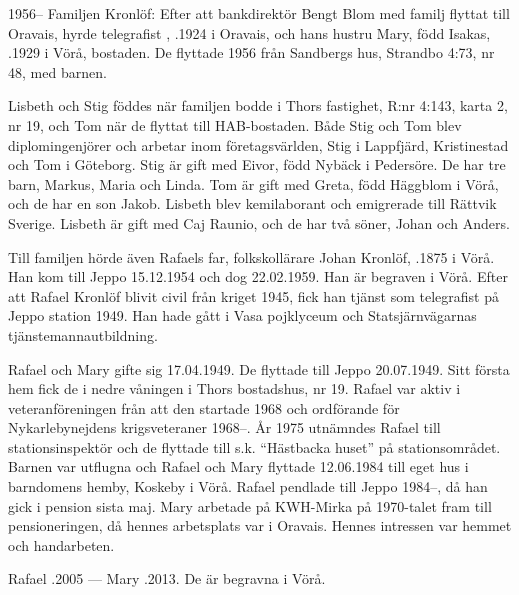 1956--
Familjen Kronlöf:	Efter att bankdirektör Bengt Blom med familj flyttat till	Oravais, hyrde telegrafist , .1924 i Oravais, och hans hustru Mary, född Isakas, .1929 i Vörå, bostaden. De flyttade 1956 från Sandbergs hus, Strandbo 4:73, nr 48, med barnen.
\begin{jhchildren}
  \item {}
  \item {}
  \item {}
\end{jhchildren}
Lisbeth och Stig föddes när familjen bodde i Thors fastighet, R:nr 4:143, karta 2, nr 19, och Tom när de flyttat till HAB-bostaden. Både Stig och Tom blev diplomingenjörer och	arbetar inom företagsvärlden, Stig i Lappfjärd, Kristinestad 	och Tom i Göteborg. Stig är gift med Eivor, född Nybäck i Pedersöre. De har tre barn, Markus, Maria och Linda. Tom är gift med Greta, född Häggblom i Vörå, och de har en son Jakob. Lisbeth blev kemilaborant och emigrerade till Rättvik	Sverige. Lisbeth är gift med Caj Raunio, och de har två söner, Johan och Anders.

Till familjen hörde även Rafaels far, folkskollärare Johan Kronlöf, .1875 i Vörå. Han kom till Jeppo 15.12.1954 och dog 22.02.1959. Han är begraven i Vörå. Efter att Rafael Kronlöf blivit civil från kriget 1945, fick han	tjänst som telegrafist på Jeppo station 1949. Han hade gått i	Vasa pojklyceum och Statsjärnvägarnas tjänstemannautbildning.

Rafael och Mary gifte sig 17.04.1949. De flyttade till Jeppo 20.07.1949. Sitt första hem fick de i nedre våningen i Thors bostadshus, nr 19.  Rafael var aktiv i veteranföreningen från att den startade 1968 och ordförande för Nykarlebynejdens krigsveteraner 1968--. År 1975 utnämndes Rafael till stationsinspektör och de flyttade till s.k. ``Hästbacka huset'' på stationsområdet. Barnen var utflugna och Rafael och Mary flyttade 12.06.1984	till eget hus i barndomens hemby, Koskeby i Vörå.	Rafael pendlade till Jeppo 1984--, då han gick i pension sista maj. Mary arbetade på KWH-Mirka på 1970-talet fram till pensioneringen, då hennes arbetsplats var i Oravais.  Hennes intressen var hemmet och handarbeten.

Rafael .2005  ---  Mary .2013. De är begravna i Vörå.


